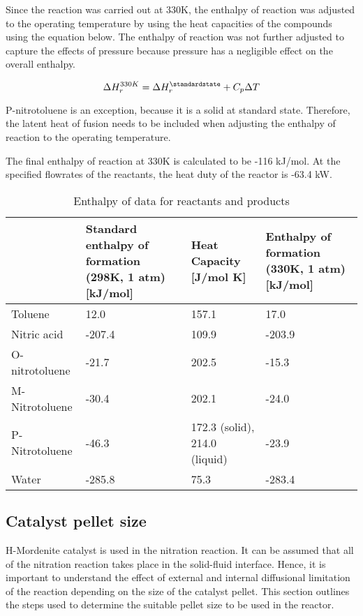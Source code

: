 Since the reaction was carried out at 330K, the enthalpy of reaction was adjusted to the operating temperature by using the heat capacities of the compounds using the equation below. The enthalpy of reaction was not further adjusted to capture the effects of pressure because pressure has a negligible effect on the overall enthalpy. 

\begin{equation}
  \Delta H_{r}^{330K} = \Delta H_{r}^{\standardstate} + C_p \Delta T
\end{equation}

P-nitrotoluene is an exception, because it is a solid at standard state. Therefore, the latent heat of fusion needs to be included when adjusting the enthalpy of reaction to the operating temperature. 

The final enthalpy of reaction at 330K is calculated to be -116 kJ/mol. At the specified flowrates of the reactants, the heat duty of the reactor is -63.4 kW.

\begin{table}[H]
\centering
\caption{Enthalpy of data for reactants and products}
\label{tab:Heat enthalpy table}
\begin{tabularx}{\linewidth}{l|XXX}
\toprule
                                                                & Standard enthalpy of formation (298K, 1 atm) [kJ/mol] & Heat Capacity [J/mol K] & Enthalpy of formation (330K, 1 atm) [kJ/mol] \\ \midrule
Toluene                        & 12.0              & 157.1              & 17.0                     \\
Nitric acid                      & -207.4              & 109.9              & -203.9                       \\
O-nitrotoluene & -21.7             & 202.5              & -15.3              \\ 
M-Nitrotoluene                      & -30.4              & 202.1             & -24.0                       \\
P-Nitrotoluene                      & -46.3              & 172.3 (solid), 214.0 (liquid)             & -23.9                        \\
Water                     & -285.8              & 75.3              & -283.4                        \\
\bottomrule
\end{tabularx}
\end{table}
\subsection{Catalyst pellet size}
H-Mordenite catalyst is used in the nitration reaction. 
It can be assumed that all of the nitration reaction takes place in the solid-fluid interface. Hence, it is important to understand the effect of external and internal diffusional limitation of the reaction depending on the size of the catalyst pellet. This section outlines the steps used to determine the suitable pellet size to be used in the reactor.

